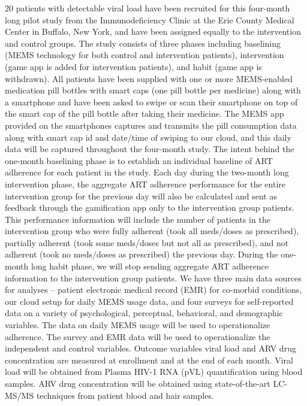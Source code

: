 20 patients with detectable viral load have been recruited for this four-month long pilot study from the Immunodeficiency Clinic at the Erie County Medical Center in Buffalo, New York, and have been assigned equally to the intervention and control groups. The study consists of three phases including baselining (MEMS technology for both control and intervention patients), intervention (game app is added for intervention patients), and habit (game app is withdrawn). All patients have been supplied with one or more MEMS-enabled medication pill bottles with smart caps (one pill bottle per medicine) along with a smartphone and have been asked to swipe or scan their smartphone on top of the smart cap of the pill bottle after taking their medicine. The MEMS app provided on the smartphones captures and transmits the pill consumption data along with smart cap id and date/time of swiping to our cloud, and this daily data will be captured throughout the four-month study. The intent behind the one-month baselining phase is to establish an individual baseline of ART adherence for each patient in the study. Each day during the two-month long intervention phase, the aggregate ART adherence performance for the entire intervention group for the previous day will also be calculated and sent as feedback through the gamification app only to the intervention group patients. This performance information will include the number of patients in the intervention group who were fully adherent (took all meds/doses as prescribed), partially adherent (took some meds/doses but not all as prescribed), and not adherent (took no meds/doses as prescribed) the previous day. During the one-month long habit phase, we will stop sending aggregate ART adherence information to the intervention group patients. We have three main data sources for analyses – patient electronic medical record (EMR) for co-morbid conditions, our cloud setup for daily MEMS usage data, and four surveys for self-reported data on a variety of psychological, perceptual, behavioral, and demographic variables. The data on daily MEMS usage will be used to operationalize adherence. The survey and EMR data will be used to operationalize the independent and control variables. Outcome variables viral load and ARV drug concentration are measured at enrollment and at the end of each month. Viral load will be obtained from Plasma HIV-1 RNA (pVL) quantification using blood samples. ARV drug concentration will be obtained using state-of-the-art LC-MS/MS techniques from patient blood and hair samples.


